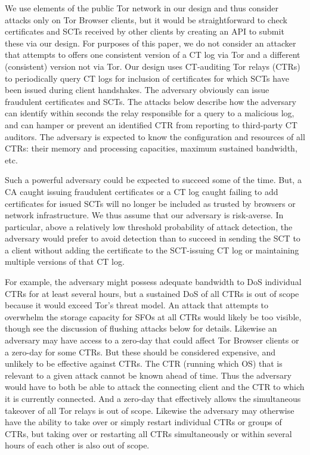 We use elements of the public Tor network in our design and thus
consider attacks only on Tor Browser clients, but it would be
straightforward to check certificates and SCTs received by other
clients by creating an API to submit these via our design. For
purposes of this paper, we do not consider an attacker that attempts
to offers one consistent version of a CT log via Tor and a different
(consistent) version not via Tor.  Our design uses CT-auditing Tor
relays (CTRs) to periodically query CT logs for inclusion of
certificates for which SCTs have been issued during client
handshakes. The adversary obviously can issue fraudulent certificates
and SCTs. The attacks below describe how the adversary can identify
within seconds the relay responsible for a query to a malicious log,
and can hamper or prevent an identified CTR from reporting to
third-party CT auditors.
The adversary is expected to know the configuration and resources of
all CTRs: their memory and processing capacities, maximum sustained
bandwidth, etc. 

Such a powerful adversary could be expected to succeed some of the
time.  But, a CA caught issuing fraudulent certificates or a CT log
caught failing to add certificates for issued SCTs will no longer be
included as trusted by browsers or network infrastructure. We thus
assume that our adversary is risk-averse.  In particular, above a
relatively low threshold probability of attack detection, the
adversary would prefer to avoid detection than to succeed in sending
the SCT to a client without adding the certificate to the SCT-issuing
CT log or maintaining multiple versions of that CT log. 

For example, the adversary might possess adequate bandwidth to DoS
individual CTRs for at least several hours, but a sustained DoS of all
CTRs is out of scope because it would exceed Tor's threat model. An
attack that attempts to overwhelm the storage capacity for SFOs at all
CTRs would likely be too visible, though see the discussion of flushing
attacks below for details. Likewise an adversary may have access to a
zero-day that could affect Tor Browser clients or a zero-day for some
CTRs. But these should be considered expensive, and unlikely to be
effective against CTRs.  The CTR (running which OS) that is relevant to a
given attack cannot be known ahead of time. Thus the adversary would
have to both be able to attack the connecting client and the CTR to
which it is currently connected. And a zero-day that effectively
allows the simultaneous takeover of all Tor relays is out of
scope. Likewise the adversary may otherwise have the ability to take
over or simply restart individual CTRs or groups of CTRs, but taking
over or restarting all CTRs simultaneously or within several hours of
each other is also out of scope.

